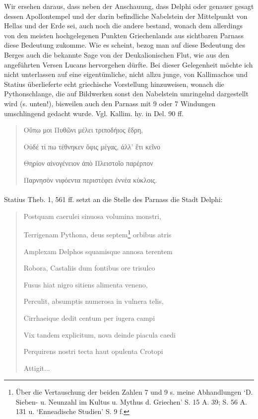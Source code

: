 \documentclass[a4paper, 11pt, oneside]{article}
\begin{document}
Wir ersehen daraus, dass neben der Anschauung, dass Delphi oder genauer gesagt dessen Apollontempel und der darin befindliche Nabelstein der Mittelpunkt von Hellas und der Erde sei, auch noch die andere bestand, wonach dem allerdings von den meisten hochgelegenen Punkten Griechenlands aus sichtbaren Parnass diese Bedeutung zukomme. Wie es scheint, bezog man auf diese Bedeutung des Berges auch die bekannte Sage von der Deukalionischen Flut, wie aus den angeführten Versen Lucans hervorgehen dürfte. Bei dieser Gelegenheit möchte ich nicht unterlassen auf eine eigentümliche, nicht allzu junge, von Kallimachos und Statius überlieferte echt griechische Vorstellung hinzuweisen, wonach die Pythonschlange, die auf Bildwerken sonst den Nabelstein umringelnd dargestellt wird (s. unten!), bisweilen auch den Parnass mit 9 oder 7 Windungen umschlingend gedacht wurde. Vgl. Kallim. hy. in Del. 90 ff.
\begin{quotation}
Οὔπω μοι Πυθῶνι μέλει τριποδήιος ἕδρη,

Οὐδέ τί πω τέθνηκεν ὄφις μέγας, ἀλλ' ἔτι κεῖνο

Θηρίον αἰνογένειον ἀπὸ Πλειστοῖο παρέρπον

Παρνησὸν νιφόεντα περιστέφει ἐννέα κύκλοις.
\end{quotation}
\paragraph{}
Statius Theb. 1, 561 ff. setzt an die Stelle des Parnass die Stadt Delphi:
\begin{quotation}
Postquam caerulei sinuosa volumina monstri,

Terrigenam Pythona, deus septem\footnote{Über die Vertauschung der beiden Zahlen 7 und 9 s. meine Abhandlungen `D. Sieben- u. Neunzahl im Kultus u. Mythus d. Griechen' S. 15 A. 39; S. 56 A. 131 u. `Enneadische Studien' S. 9 f.} orbibus atris

Amplexam Delphos squamisque annosa terentem

Robora, Castaliis dum fontibus ore trisulco

Fusus hiat nigro sitiens alimenta veneno,

Perculit, absumptis numerosa in vulnera telis,

Cirrhaeique dedit centum per iugera campi

Vix tandem explicitum, nova deinde piacula caedi

Perquirens nostri tecta haut opulenta Crotopi

Attigit...
\end{quotation}
\end{document}
